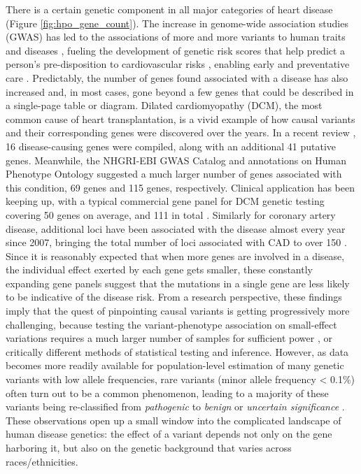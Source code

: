 \documentclass[letter]{bioinfo}
\begin{document}
There is a certain genetic component in all major categories of heart disease (Figure \ref{fig:hpo_gene_count}). The increase in genome-wide association studies (GWAS) has led to the associations of more and more variants to human traits and diseases \citep{Visscher:2017:10}, fueling the development of genetic risk scores that help predict a person's pre-disposition to cardiovascular risks \citep{Ganna:2013:Multilocus,Goldstein:2014:Simple,Krarup:2015:genetic,Tada:2016:Risk, Abraham:2016:Genomic}, enabling early and preventative care \citep{Assimes:2016:Genetic}. Predictably, the number of genes found associated with a disease has also increased and, in most cases, gone beyond a few genes that could be described in a single-page table or diagram.  Dilated cardiomyopathy (DCM), the most common cause of heart transplantation, is a vivid example of how causal variants and their corresponding genes were discovered over the years.  In a recent review \citep{Burke:2016:Clinical}, 16 disease-causing genes were compiled, along with an additional 41 putative genes.  Meanwhile, the NHGRI-EBI GWAS Catalog \citep{MacArthur:2017:new} and annotations on Human Phenotype Ontology \citep{Kohler:2017:Human} suggested a much larger number of genes associated with this condition, 69 genes and 115 genes, respectively.  Clinical application has been keeping up, with a typical commercial gene panel for DCM genetic testing covering 50 genes on average, and 111 in total \citep{McNally:2017:Dilated}.  Similarly for coronary artery disease, additional loci have been associated with the disease almost every year since 2007, bringing the total number of loci associated with CAD to over 150 \citep{Clarke:2018:GenomeWide}.  Since it is reasonably expected that when more genes are involved in a disease, the individual effect exerted by each gene gets smaller, these constantly expanding gene panels suggest that the mutations in a single gene are less likely to be indicative of the disease risk. From a research perspective, these findings imply that the quest of pinpointing causal variants is getting progressively more challenging, because testing the variant-phenotype association on small-effect variations requires a much larger number of samples for sufficient power \citep{Visscher:2017:10}, or critically different methods of statistical testing and inference. However, as data becomes more readily available for population-level estimation of many genetic variants with low allele frequencies, rare variants (minor allele frequency < 0.1\%) often turn out to be a common phenomenon, leading to a majority of these variants being re-classified from \textit{pathogenic} to \textit{benign} or \textit{uncertain significance} \citep{Lek:2016:Analysis}. These observations open up a small window into the complicated landscape of human disease genetics: the effect of a variant depends not only on the gene harboring it, but also on the genetic background that varies across races/ethnicities.  
\end{document}
